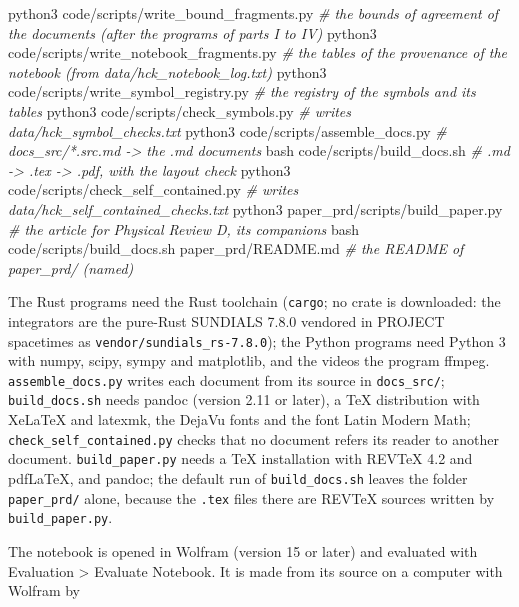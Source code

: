 \documentclass[
  10pt,
]{article}
\newenvironment{Shaded}{}{}
\newcommand{\CommentTok}[1]{\textcolor[rgb]{0.38,0.63,0.69}{\textit{#1}}}
\newcommand{\ExtensionTok}[1]{#1}
\newcommand{\FunctionTok}[1]{\textcolor[rgb]{0.02,0.16,0.49}{#1}}
\newcommand{\NormalTok}[1]{#1}
\begin{document}
\begin{Shaded}
\begin{Highlighting}[]
\ExtensionTok{python3}\NormalTok{ code/scripts/write\_bound\_fragments.py }\CommentTok{\# the bounds of agreement of the documents (after the programs of parts I to IV)}
\ExtensionTok{python3}\NormalTok{ code/scripts/write\_notebook\_fragments.py }\CommentTok{\# the tables of the provenance of the notebook (from data/hck\_notebook\_log.txt)}
\ExtensionTok{python3}\NormalTok{ code/scripts/write\_symbol\_registry.py }\CommentTok{\# the registry of the symbols and its tables}
\ExtensionTok{python3}\NormalTok{ code/scripts/check\_symbols.py         }\CommentTok{\# writes data/hck\_symbol\_checks.txt}
\ExtensionTok{python3}\NormalTok{ code/scripts/assemble\_docs.py         }\CommentTok{\# docs\_src/*.src.md {-}\textgreater{} the .md documents}
\FunctionTok{bash}\NormalTok{ code/scripts/build\_docs.sh               }\CommentTok{\# .md {-}\textgreater{} .tex {-}\textgreater{} .pdf, with the layout check}
\ExtensionTok{python3}\NormalTok{ code/scripts/check\_self\_contained.py  }\CommentTok{\# writes data/hck\_self\_contained\_checks.txt}
\ExtensionTok{python3}\NormalTok{ paper\_prd/scripts/build\_paper.py      }\CommentTok{\# the article for Physical Review D, its companions}
\FunctionTok{bash}\NormalTok{ code/scripts/build\_docs.sh paper\_prd/README.md  }\CommentTok{\# the README of paper\_prd/ (named)}
\end{Highlighting}
\end{Shaded}

The Rust programs need the Rust toolchain (\texttt{cargo}; no crate is
downloaded: the integrators are the pure-Rust SUNDIALS 7.8.0 vendored in
PROJECT spacetimes as \texttt{vendor/sundials\_rs-7.8.0}); the Python
programs need Python 3 with numpy, scipy, sympy and matplotlib, and the
videos the program ffmpeg. \texttt{assemble\_docs.py} writes each
document from its source in \texttt{docs\_src/}; \texttt{build\_docs.sh}
needs pandoc (version 2.11 or later), a TeX distribution with XeLaTeX
and latexmk, the DejaVu fonts and the font Latin Modern Math;
\texttt{check\_self\_contained.py} checks that no document refers its
reader to another document. \texttt{build\_paper.py} needs a TeX
installation with REVTeX 4.2 and pdfLaTeX, and pandoc; the default run
of \texttt{build\_docs.sh} leaves the folder \texttt{paper\_prd/} alone,
because the \texttt{.tex} files there are REVTeX sources written by
\texttt{build\_paper.py}.

The notebook is opened in Wolfram (version 15 or later) and evaluated
with Evaluation \textgreater{} Evaluate Notebook. It is made from its
source on a computer with Wolfram by
\end{document}
